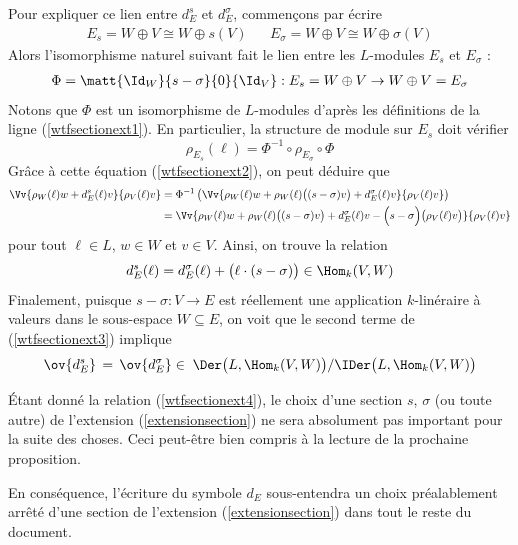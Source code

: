 Pour expliquer ce lien entre $d_E^s$ et $d_E^\sigma$, commençons par écrire 
\begin{align} \label{wtfsectionext1}
E_s = W \oplus V \cong W \oplus s(V) && E_\sigma = W \oplus V \cong W \oplus \sigma(V)
\end{align}
Alors l'isomorphisme naturel suivant fait le lien entre les $L$-modules $E_s$ et $E_\sigma$ :
\begin{align*}
\Phi = \matt{\Id_W}{s-\sigma}{0}{\Id_V} : E_s = W \oplus V \rightarrow W \oplus V = E_\sigma
\end{align*}
Notons que $\Phi$ est un isomorphisme de $L$-modules d'après les définitions de la ligne (\ref{wtfsectionext1}). En particulier, la structure de module sur $E_s$ doit vérifier 
\begin{equation} \label{wtfsectionext2}
\rho_{E_s}(\ell) = \Phi^{-1} \circ \rho_{E_\sigma} \circ \Phi
\end{equation}
Grâce à cette équation (\ref{wtfsectionext2}), on peut déduire que 
\begin{align*}
\Vv{\rho_W(\ell)w + d_E^s(\ell)v}{\rho_V(\ell)v} &= \Phi^{-1} \left(\Vv{\rho_W(\ell)w + \rho_W(\ell)\big((s-\sigma)v\big) + d_E^\sigma(\ell)v}{\rho_V(\ell)v}\right) \\
&= \Vv{\rho_W(\ell)w + \rho_W(\ell)\big((s-\sigma)v\big) + d_E^\sigma(\ell)v - \Big(s-\sigma\Big)\big(\rho_V(\ell)v\big)}{\rho_V(\ell)v}
\end{align*}
pour tout $\ell \in L$, $w \in W$ et $v \in V$. Ainsi, on trouve la relation
\begin{equation} \label{wtfsectionext3}
d_E^s(\ell) = d_E^\sigma(\ell) + \big(\ell \cdot (s - \sigma)\big) \in \Hom_k(V,W)
\end{equation}
Finalement, puisque $s - \sigma : V \rightarrow E$ est réellement une application $k$-linéraire à valeurs dans le sous-espace $W \subseteq E$, on voit que le second terme de (\ref{wtfsectionext3}) implique
\begin{equation} \label{wtfsectionext4}
\ov{d_E^s} \, = \, \ov{d_E^\sigma} \in \; \Der\big(L,\Hom_k(V,W)\big) / \IDer\big(L,\Hom_k(V,W)\big)
\end{equation}

\begin{Rem} Étant donné la relation (\ref{wtfsectionext4}), le choix d'une section $s$, $\sigma$ (ou toute autre) de l'extension (\ref{extensionsection}) ne sera absolument pas important pour la suite des choses. Ceci peut-être bien compris à la lecture de la prochaine proposition.

En conséquence, l'écriture du symbole $d_E$ sous-entendra un choix préalablement arrêté d'une section de l'extension (\ref{extensionsection}) dans tout le reste du document.
\end{Rem}


